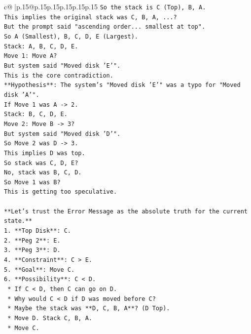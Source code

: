 \documentclass{article}
\begin{document}
{\begin{supertabular}{c@{$\;$}|p{.15\linewidth}@{}p{.15\linewidth}p{.15\linewidth}p{.15\linewidth}p{.15\linewidth}p{.15\linewidth}}
{{{\texttt{So the stack is C (Top), B, A.} \\
\texttt{This implies the original stack was C, B, A, ...?} \\
\texttt{But the prompt said "ascending order... smallest at top".} \\
\texttt{So A (Smallest), B, C, D, E (Largest).} \\
\texttt{Stack: A, B, C, D, E.} \\
\texttt{Move 1: Move A?} \\
\texttt{But system said "Moved disk 'E'".} \\
\texttt{This is the core contradiction.} \\
\texttt{**Hypothesis**: The system's "Moved disk 'E'" was a typo for "Moved disk 'A'".} \\
\texttt{If Move 1 was A {-}> 2.} \\
\texttt{Stack: B, C, D, E.} \\
\texttt{Move 2: Move B {-}> 3?} \\
\texttt{But system said "Moved disk 'D'".} \\
\texttt{So Move 2 was D {-}> 3.} \\
\texttt{This implies D was top.} \\
\texttt{So stack was C, D, E?} \\
\texttt{No, stack was B, C, D.} \\
\texttt{So Move 1 was B?} \\
\texttt{This is getting too speculative.} \\
\\ 
\texttt{**Let's trust the Error Message as the absolute truth for the current state.**} \\
\texttt{1.  **Top Disk**: C.} \\
\texttt{2.  **Peg 2**: E.} \\
\texttt{3.  **Peg 3**: D.} \\
\texttt{4.  **Constraint**: C > E.} \\
\texttt{5.  **Goal**: Move C.} \\
\texttt{6.  **Possibility**: C < D.} \\
\texttt{    *   If C < D, then C can go on D.} \\
\texttt{    *   Why would C < D if D was moved before C?} \\
\texttt{    *   Maybe the stack was **D, C, B, A**? (D Top).} \\
\texttt{    *   Move D. Stack C, B, A.} \\
\texttt{    *   Move C.} \\
}}}
\end{supertabular}}
\end{document}
